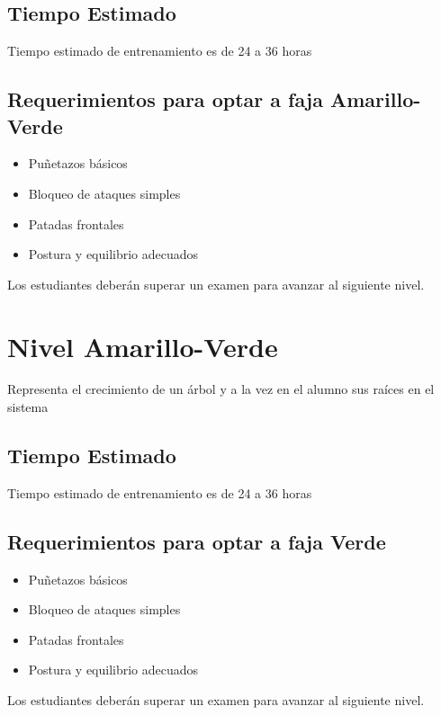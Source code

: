\subsection[Duración]{Tiempo Estimado}

Tiempo estimado de entrenamiento es de 24 a 36 horas

\subsection{Requerimientos para optar a faja Amarillo-Verde}

\begin{itemize}
	\item Puñetazos básicos
	\item Bloqueo de ataques simples
	\item Patadas frontales
	\item Postura y equilibrio adecuados
\end{itemize}

Los estudiantes deberán superar un examen para avanzar al siguiente nivel.

\section{Nivel Amarillo-Verde}

Representa el crecimiento de un árbol y a la vez en el alumno sus raíces en el sistema

\subsection[Duración]{Tiempo Estimado}

Tiempo estimado de entrenamiento es de 24 a 36 horas

\subsection{Requerimientos para optar a faja Verde}

\begin{itemize}
	\item Puñetazos básicos
	\item Bloqueo de ataques simples
	\item Patadas frontales
	\item Postura y equilibrio adecuados
\end{itemize}

Los estudiantes deberán superar un examen para avanzar al siguiente nivel.


